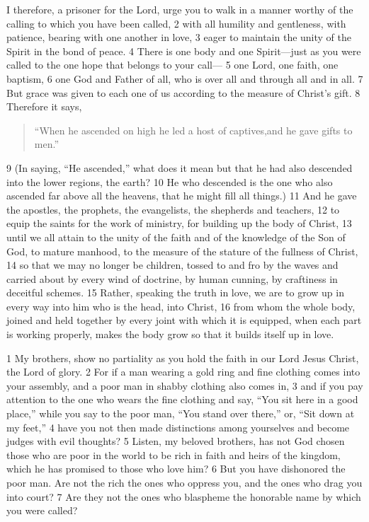 \begin{bible}
I therefore, a prisoner for the Lord, urge you to walk in a manner worthy of the calling to which you have been called, 2 with all humility and gentleness, with patience, bearing with one another in love, 3 eager to maintain the unity of the Spirit in the bond of peace. 4 There is one body and one Spirit—just as you were called to the one hope that belongs to your call— 5 one Lord, one faith, one baptism, 6 one God and Father of all, who is over all and through all and in all. 7 But grace was given to each one of us according to the measure of Christ's gift. 8 Therefore it says,
\begin{quote}
``When he ascended on high he led a host of captives,and he gave gifts to men.''
\end{quote}
9 (In saying, ``He ascended,'' what does it mean but that he had also descended into the lower regions, the earth? 10 He who descended is the one who also ascended far above all the heavens, that he might fill all things.) 11 And he gave the apostles, the prophets, the evangelists, the shepherds and teachers, 12 to equip the saints for the work of ministry, for building up the body of Christ, 13 until we all attain to the unity of the faith and of the knowledge of the Son of God, to mature manhood, to the measure of the stature of the fullness of Christ, 14 so that we may no longer be children, tossed to and fro by the waves and carried about by every wind of doctrine, by human cunning, by craftiness in deceitful schemes. 15 Rather, speaking the truth in love, we are to grow up in every way into him who is the head, into Christ, 16 from whom the whole body, joined and held together by every joint with which it is equipped, when each part is working properly, makes the body grow so that it builds itself up in love.

1 My brothers, show no partiality as you hold the faith in our Lord Jesus Christ, the Lord of glory. 2 For if a man wearing a gold ring and fine clothing comes into your assembly, and a poor man in shabby clothing also comes in, 3 and if you pay attention to the one who wears the fine clothing and say, ``You sit here in a good place,'' while you say to the poor man, ``You stand over there,'' or, ``Sit down at my feet,'' 4 have you not then made distinctions among yourselves and become judges with evil thoughts? 5 Listen, my beloved brothers, has not God chosen those who are poor in the world to be rich in faith and heirs of the kingdom, which he has promised to those who love him? 6 But you have dishonored the poor man. Are not the rich the ones who oppress you, and the ones who drag you into court? 7 Are they not the ones who blaspheme the honorable name by which you were called?

\end{bible}


